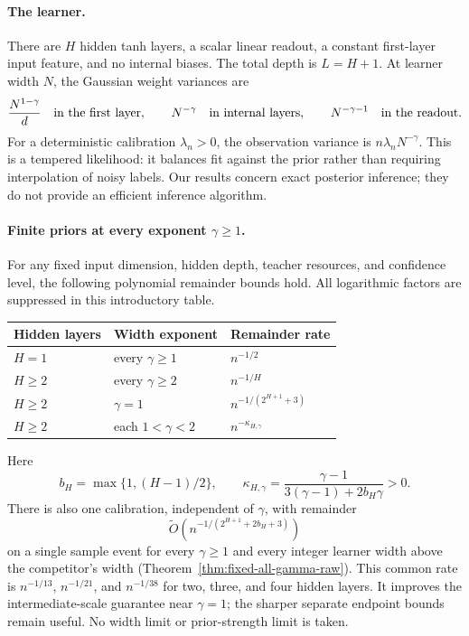 \documentclass[11pt]{article}
\theoremstyle{remark}\newtheorem{remark}[theorem]{Remark}
\begin{document}
\paragraph{The learner.}
There are $H$ hidden tanh layers, a scalar linear readout, a constant first-layer input feature, and no internal biases. The total depth is $L=H+1$. At learner width $N$, the Gaussian weight variances are
\[
 \frac{N^{1-\gamma}}d\quad\hbox{in the first layer},\qquad
 N^{-\gamma}\quad\hbox{in internal layers},\qquad
 N^{-\gamma-1}\quad\hbox{in the readout}.
\]
For a deterministic calibration $\lambda_n>0$, the observation variance is $n\lambda_nN^{-\gamma}$. This is a tempered likelihood: it balances fit against the prior rather than requiring interpolation of noisy labels. Our results concern exact posterior inference; they do not provide an efficient inference algorithm.

\paragraph{Finite priors at every exponent $\gamma\ge1$.}
For any fixed input dimension, hidden depth, teacher resources, and confidence level, the following polynomial remainder bounds hold. All logarithmic factors are suppressed in this introductory table.
\begin{center}
\begin{tabular}{lll}
\toprule
Hidden layers & Width exponent & Remainder rate \\
\midrule
$H=1$ & every $\gamma\ge1$ & $n^{-1/2}$ \\
$H\ge2$ & every $\gamma\ge2$ & $n^{-1/H}$ \\
$H\ge2$ & $\gamma=1$ & $n^{-1/(2^{H+1}+3)}$ \\
$H\ge2$ & each $1<\gamma<2$ & $n^{-\kappa_{H,\gamma}}$ \\
\bottomrule
\end{tabular}
\end{center}
Here
\[
 b_H=\max\{1,(H-1)/2\},\qquad
 \kappa_{H,\gamma}=
 \frac{\gamma-1}{3(\gamma-1)+2b_H\gamma}>0.
\]
There is also one calibration, independent of $\gamma$, with remainder
\[
 \widetilde O\!\left(n^{-1/(2^{H+1}+2b_H+3)}\right)
\]
on a single sample event for every $\gamma\ge1$ and every integer learner width above the competitor's width (Theorem~\ref{thm:fixed-all-gamma-raw}). This common rate is $n^{-1/13}$, $n^{-1/21}$, and $n^{-1/38}$ for two, three, and four hidden layers. It improves the intermediate-scale guarantee near $\gamma=1$; the sharper separate endpoint bounds remain useful. No width limit or prior-strength limit is taken.
\end{document}
